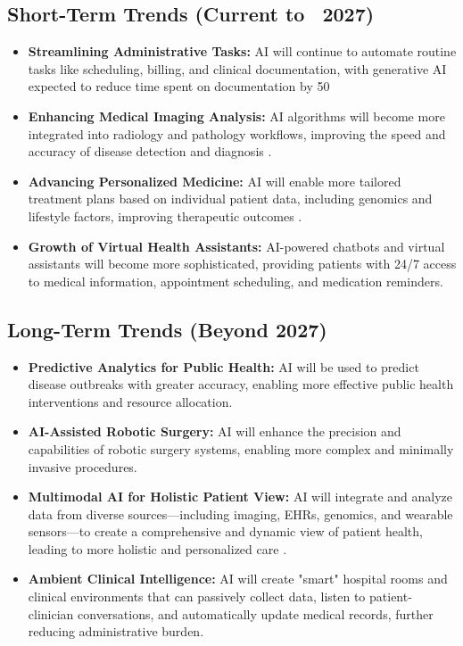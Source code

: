\subsection{Short-Term Trends (Current to ~2027)}
\begin{itemize}
    \item \textbf{Streamlining Administrative Tasks:} AI will continue to automate routine tasks like scheduling, billing, and clinical documentation, with generative AI expected to reduce time spent on documentation by 50%
    \item \textbf{Enhancing Medical Imaging Analysis:} AI algorithms will become more integrated into radiology and pathology workflows, improving the speed and accuracy of disease detection and diagnosis \cite{MedicalBuyer_FutureTrends}.
    \item \textbf{Advancing Personalized Medicine:} AI will enable more tailored treatment plans based on individual patient data, including genomics and lifestyle factors, improving therapeutic outcomes \cite{Cpluz_FutureTrends}.
    \item \textbf{Growth of Virtual Health Assistants:} AI-powered chatbots and virtual assistants will become more sophisticated, providing patients with 24/7 access to medical information, appointment scheduling, and medication reminders.
\end{itemize}

\subsection{Long-Term Trends (Beyond 2027)}
\begin{itemize}
    \item \textbf{Predictive Analytics for Public Health:} AI will be used to predict disease outbreaks with greater accuracy, enabling more effective public health interventions and resource allocation.
    \item \textbf{AI-Assisted Robotic Surgery:} AI will enhance the precision and capabilities of robotic surgery systems, enabling more complex and minimally invasive procedures.
    \item \textbf{Multimodal AI for Holistic Patient View:} AI will integrate and analyze data from diverse sources—including imaging, EHRs, genomics, and wearable sensors—to create a comprehensive and dynamic view of patient health, leading to more holistic and personalized care \cite{Intersog_FutureTrends}.
    \item \textbf{Ambient Clinical Intelligence:} AI will create "smart" hospital rooms and clinical environments that can passively collect data, listen to patient-clinician conversations, and automatically update medical records, further reducing administrative burden.
\end{itemize}

